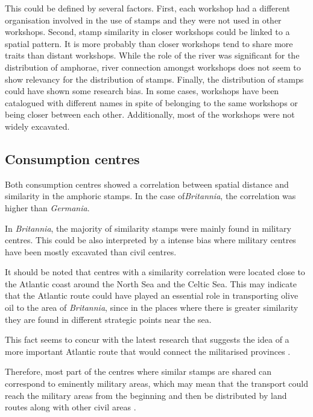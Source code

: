 \documentclass[review]{elsarticle}
\begin{document}
This could be defined by several factors. First, each workshop had a different organisation involved in the use of stamps and they were not used in other workshops. Second, stamp similarity in closer workshops could be linked to a spatial pattern. It is more probably than closer workshops tend to share more traits than distant workshops. While the role of the river was significant for the distribution of amphorae, river connection amongst workshops does not seem to show relevancy for the distribution of stamps. Finally, the distribution of stamps could have shown some research bias. In some cases, workshops have been catalogued with different names in spite of belonging to the same workshops or being closer between each other. Additionally, most of the workshops were not widely excavated. 


\subsection{Consumption centres}

Both consumption centres showed a correlation between spatial distance and similarity in the amphoric stamps. In the case of\textit{Britannia}, the correlation was higher than \textit{Germania}.

In \textit{Britannia}, the majority of similarity stamps were mainly found in military centres. This could be also interpreted by a intense bias where military centres have been mostly excavated than civil centres. 

It should be noted that centres with a similarity correlation were located close to the Atlantic coast around the North Sea and the Celtic Sea. This may indicate that the Atlantic route could have played an essential role in transporting olive oil to the area of \textit{Britannia}, since in the places where there is greater similarity they are found in different strategic points near the sea.

This fact seems to concur with the latest research that suggests the idea of a more important Atlantic route that would connect the militarised provinces \citep{remesal_annona_1986,
remesal_provincial_2008,
carreras_atlantic_2012,
morillo_hispania_2016,rubio-campillo_provincias_2018}.

Therefore, most part of the centres where similar stamps are shared can correspond to eminently military areas, which may mean that the transport could reach the military areas from the beginning and then be distributed by land routes along with other civil areas \citep{carreras_britannia_1998,
ayllon_olive_2018}.
\end{document}

